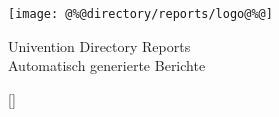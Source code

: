 \documentclass[a4paper,9pt,DIV10]{scrartcl}
\begin{document}
\setlength{\parskip}{1ex plus 0.3ex minus 0.1ex}
\setlength{\oddsidemargin}{0.5cm}
\setlength{\evensidemargin}{0.9cm}

\sffamily

\thispagestyle{empty}
\begin{flushright}
  \texttt{[image: @\%@directory/reports/logo@\%@]}
\end{flushright}
\sffamily \bfseries

\begin{center}
  \vspace {1.0cm}
  \Huge
  Univention Directory Reports\\ [1.5cm]
  \Large
  Automatisch generierte Berichte
  \vspace*{3.0cm}

\end{center}
\normalsize
\normalfont
\newpage

\pagestyle{scrheadings}
\sffamily
{}
\setfootsepline{0.4pt}[\color{ucsRed}]
\ofoot{\pagemark /\pageref{LastPage}}
\ifoot{}
\cfoot{}

\end{document}
